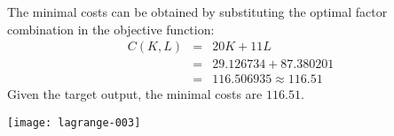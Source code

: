 \begin{solution}
 The minimal costs can be obtained by substituting the optimal factor combination in the objective function:
 \begin{eqnarray*}
 C(K, L) & = & 20 K + 11 L\\
         & = & 29.126734 + 87.380201 \\
         & = & 116.506935 \approx 116.51
 \end{eqnarray*}
Given the target output, the minimal costs are $116.51$.

\texttt{[image: lagrange-003]}
\end{solution}


